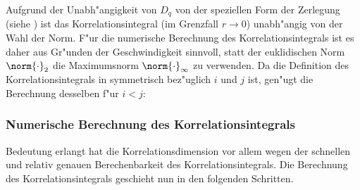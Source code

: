 Aufgrund der Unabh"angigkeit von $D_q$ von der speziellen Form der Zerlegung
(siehe ) ist das Korrelationsintegral (im Grenzfall $r\to0$) unabh"angig von
der Wahl der Norm. F"ur die numerische Berechnung des Korrelationsintegrals ist es daher
aus Gr"unden der Geschwindigkeit sinnvoll, statt der euklidischen Norm $\norm{\cdot}_2$ die
Maximumsnorm $\norm{\cdot}_\infty$ zu verwenden. Da die Definition des
Korrelationsintegrals in  symmetrisch bez"uglich $i$ und $j$ ist, gen"ugt
die Berechnung desselben f"ur $i<j$:



\subsubsection{Numerische Berechnung des Korrelationsintegrals}
Bedeutung erlangt hat die Korrelationsdimension vor allem wegen der schnellen und
relativ genauen Berechenbarkeit des Korrelationsintegrals. 
Die Berechnung des Korrelationsintegrals geschieht nun in den folgenden Schritten.
